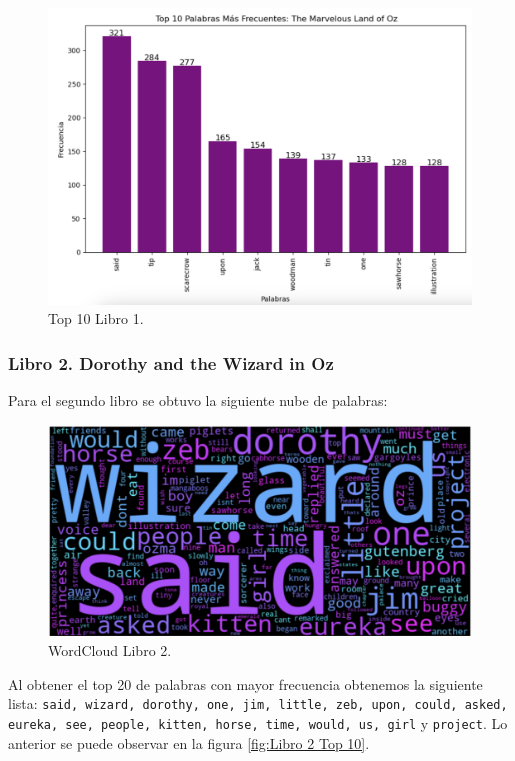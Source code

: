 \documentclass[conference]{IEEEtran}
\begin{document}
	\begin{figure}[h]
    \centering
    \includegraphics[width=0.9\linewidth]{Libro 1 Top 10 palabras más frecuentes.png}
    \caption{Top 10 Libro 1.}
    \label{fig:Libro 1 Top 10}
	\end{figure}

	\FloatBarrier


\subsubsection{Libro 2. Dorothy and the Wizard in Oz}

Para el segundo libro se obtuvo la siguiente nube de palabras:

	\begin{figure}[h]
    \centering
    \includegraphics[width=0.8\linewidth]{Libro 2 WordCloud.png}
    \caption{WordCloud Libro 2.}
    \label{fig:Libro 2 WordCloud}
	\end{figure}

	\FloatBarrier

Al obtener el top 20 de palabras con mayor frecuencia obtenemos la siguiente lista: \texttt{said, wizard, dorothy, one, jim, little, zeb, upon, could, asked, eureka, see, people, kitten, horse, time, would, us, girl} y \texttt{project}. Lo anterior se puede observar en la figura \ref{fig:Libro 2 Top 10}.  
\end{document}
